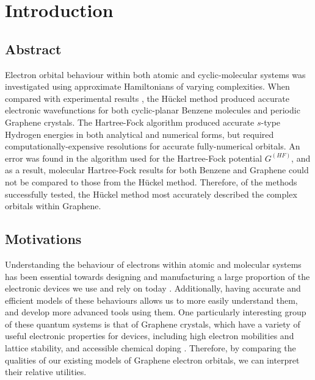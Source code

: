 \chapter{Introduction}\label{ch:introduction}

\section{Abstract}\label{sec:abstract}

Electron orbital behaviour within both atomic and cyclic-molecular systems was investigated using approximate Hamiltonians of varying complexities. When compared with experimental results \cite{szwacki_aromatic_2009}\cite{neto_electronic_2009}, the Hückel method \cite{yates_huckel_2012} produced accurate electronic wavefunctions for both cyclic-planar Benzene molecules and periodic Graphene crystals. The Hartree-Fock algorithm \cite{laaksonen_fully_1986}\cite{quiney_art_nodate} produced accurate $s$-type Hydrogen energies in both analytical and numerical forms, but required computationally-expensive resolutions for accurate fully-numerical orbitals. An error was found in the algorithm used for the Hartree-Fock potential $G^{(HF)}$, and as a result, molecular Hartree-Fock results for both Benzene and Graphene could not be compared to those from the Hückel method. Therefore, of the methods successfully tested, the Hückel method most accurately described the complex orbitals within Graphene.



\section{Motivations}\label{sec:motivations}

Understanding the behaviour of electrons within atomic and molecular systems has been essential towards designing and manufacturing a large proportion of the electronic devices we use and rely on today \cite{nalewajski_perspectives_2012}. Additionally, having accurate and efficient models of these behaviours allows us to more easily understand them, and develop more advanced tools using them. One particularly interesting group of these quantum systems is that of Graphene crystals, which have a variety of useful electronic properties for devices, including high electron mobilities and lattice stability, and accessible chemical doping \cite{lu_semiconducting_2013}. Therefore, by comparing the qualities of our existing models of Graphene electron orbitals, we can interpret their relative utilities.

